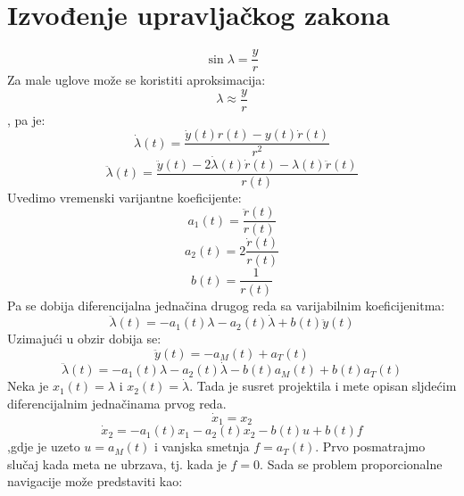 \section{Izvođenje upravljačkog zakona}
\begin{equation}
    \sin{\lambda}=\frac{y}{r}
\end{equation}
Za male uglove može se koristiti aproksimacija:
\begin{equation}
    \lambda \approx \frac{y}{r}
\end{equation}
, pa je:
\begin{equation}
    \dot{\lambda}(t)=\frac{\dot{y}(t)r(t)-y(t)\dot{r}(t)}{r^2}
\end{equation}
\begin{equation}
    \ddot{\lambda}(t)=\frac{\ddot{y}(t)-2\dot{\lambda}(t)\dot{r}(t)-\lambda(t)\ddot{r}(t)}{r(t)}
\end{equation}
Uvedimo vremenski varijantne koeficijente:
\begin{equation}
    a_1(t)=\frac{\ddot{r}(t)}{r(t)}
\end{equation}
\begin{equation}
    a_2(t)=2\frac{\dot{r}(t)}{r(t)}
\end{equation}
\begin{equation}
    b(t)=\frac{1}{r(t)}
\end{equation}
Pa se dobija diferencijalna jednačina drugog reda sa varijabilnim koeficijenitma:
\begin{equation}
    \ddot{\lambda}(t)=-a_1(t)\lambda-a_2(t)\dot{\lambda}+b(t)\ddot{y}(t)
\end{equation}
Uzimajući u obzir dobija se:
\begin{equation}
    \ddot{y}(t)=-a_M(t)+a_T(t)
\end{equation}
\begin{equation}
    \ddot{\lambda}(t)=-a_1(t)\lambda-a_2(t)\dot{\lambda}-b(t)a_M(t)+b(t)a_T(t)
\end{equation}
Neka je $x_1(t)=\lambda$ i $x_2(t)=\dot{\lambda}$. Tada je susret projektila i mete opisan sljdećim diferencijalnim jednačinama prvog reda.
\begin{equation}
    \dot{x}_1=x_2
    \label{eq:1}
\end{equation}
\begin{equation}
    \dot{x}_2=-a_1(t)x_1-a_2(t)x_2-b(t)u+b(t)f
    \label{eq:2}
\end{equation}
,gdje je uzeto $u=a_M(t)$ i vanjska smetnja $f=a_T(t)$.
Prvo posmatrajmo slučaj kada meta ne ubrzava, tj. kada je $f=0$. Sada se problem proporcionalne navigacije može predstaviti kao:
